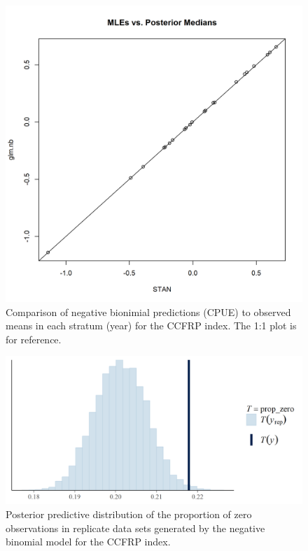 \documentclass[12pt,]{article}
\begin{document}
\begin{figure}
\centering
\includegraphics{Figures/Fleet9_MLE_stan.png}
\caption{Comparison of negative bionimial predictions (CPUE) to observed
means in each stratum (year) for the CCFRP index. The 1:1 plot is for
reference. \label{fig:Fleet9_MLE_stan}}
\end{figure}

\FloatBarrier

\begin{figure}
\centering
\includegraphics{Figures/Fleet9_prop_zero_STAN.png}
\caption{Posterior predictive distribution of the proportion of zero
observations in replicate data sets generated by the negative binomial
model for the CCFRP index. \label{fig:Fleet9_prop_zero_STAN}}
\end{figure}
\end{document}
